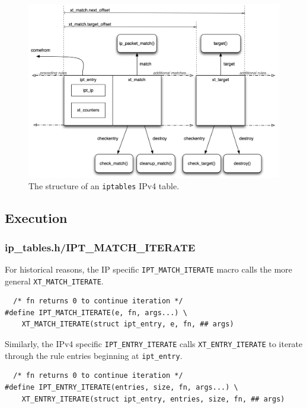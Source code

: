 \documentclass[a4paper,10pt]{article}
\newcommand{\code}[1]{\texttt{{#1}}}
\begin{document}
\begin{figure}[H]
\centering
\includegraphics[totalheight=0.40\textheight]{images/table1.png}
\caption{The structure of an \code{iptables} IPv4 table.}\label{fig:table1}
\end{figure}

\subsection{Execution}

\subsubsection{ip\_tables.h/IPT\_MATCH\_ITERATE}

For historical reasons, the IP specific \code{IPT\_MATCH\_ITERATE}
macro calls the more general \code{XT\_MATCH\_ITERATE}. 

\begin{lstlisting}
  /* fn returns 0 to continue iteration */
#define IPT_MATCH_ITERATE(e, fn, args...) \
	XT_MATCH_ITERATE(struct ipt_entry, e, fn, ## args)
\end{lstlisting}

Similarly, the IPv4 specific \code{IPT\_ENTRY\_ITERATE} calls
\code{XT\_ENTRY\_ITERATE} to iterate through the rule entries beginning
at \code{ipt\_entry}.

\begin{lstlisting}
  /* fn returns 0 to continue iteration */
#define IPT_ENTRY_ITERATE(entries, size, fn, args...) \
	XT_ENTRY_ITERATE(struct ipt_entry, entries, size, fn, ## args)
\end{lstlisting}
\end{document}

